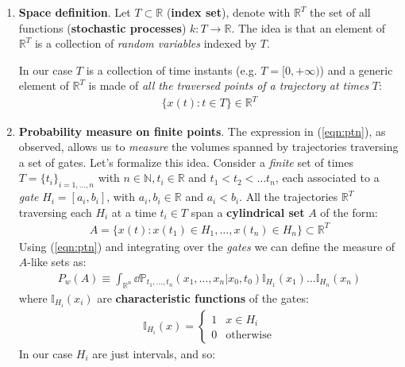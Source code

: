 \documentclass[../template.tex]{subfiles}
\begin{document}
\begin{enumerate}
    \item \textbf{Space definition}. Let $T \subset \mathbb{R}$ (\textbf{index set}), denote with $\mathbb{R}^T$ the set of all functions (\textbf{stochastic processes}) $k\colon T \to \mathbb{R}$. The idea is that an element of $\mathbb{R}^T$ is a collection of \textit{random variables} indexed by $T$.
    
    In our case $T$ is a collection of time instants (e.g. $T=[0,+\infty)$) and a generic element of $\mathbb{R}^T$ is made of \textit{all the traversed points of a trajectory at times} $T$:  
    \begin{align*}
        \{x(t) \colon t \in T\} \in \mathbb{R}^T
    \end{align*}
    \item \textbf{Probability measure on finite points}. The expression in (\ref{eqn:ptn}), as observed, allows us to \textit{measure} the volumes spanned by trajectories traversing a set of gates. Let's formalize this idea. Consider a \textit{finite} set of times $T = \{t_i\}_{i=1,\dots,n}$ with $n \in \mathbb{N}, t_i \in \mathbb{R}$ and $t_1 < t_2 < \dots t_n$, each associated to a \textit{gate} $H_i = [a_i, b_i]$, with $a_i, b_i \in \mathbb{R}$ and $a_i < b_i$.        
    All the trajectories $\mathbb{R}^T$ traversing each $H_i$ at a time $t_i \in T$ span a \textbf{cylindrical set} $A$ of the form: 
    \begin{align*}
        A = \{x(t)\colon x(t_1) \in H_1, \dots, x(t_n) \in H_n\} \subset \mathbb{R}^T
    \end{align*}
    Using (\ref{eqn:ptn}) and integrating over the \textit{gates} we can define the measure of $A$-like sets as:
    \begin{align*}
        P_w(A) \equiv \int_{\mathbb{R}^n} \dd{\mathbb{P}}_{t_1,\dots,t_n} (x_1,\dots,x_n|x_0,t_0) \mathbb{I}_{H_1}(x_1) \dots \mathbb{I}_
        {H_n}(x_n)
    \end{align*}  
    where $\mathbb{I}_{H_i}(x_i)$ are \textbf{characteristic functions} of the gates:
    \begin{align*}
        \mathbb{I}_{H_i}(x) = \begin{cases}
            1 & x \in H_i\\
            0 & \text{otherwise}
        \end{cases}
    \end{align*}  
    In our case $H_i$ are just intervals, and so:
    \begin{align}

\end{align}
\end{enumerate}
\end{document}
